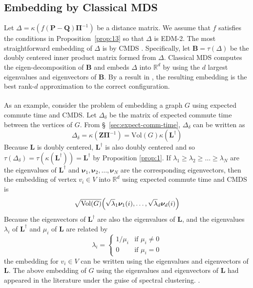 \documentclass[10pt,twocolumn]{article}
\numberwithin{equation}{section}
\begin{document}
\subsection{Embedding by Classical MDS}
\label{sec:embedd-class-mds}
Let $\Delta = \kappa(f(\mathbf{P} - \mathbf{Q})\bm{\Pi}^{-1})$ be a
distance matrix. We assume that $f$ satisfies the conditions in
Proposition~\ref{prop:13} so that $\Delta$ is EDM-2. The most
straightforward embedding of $\Delta$ is by CMDS
\cite{gower66:_some,torgesen52:_multid}. Specifically, let $\mathbf{B}
= \tau(\Delta)$ be the doubly centered inner product matrix
formed from $\Delta$. Classical MDS computes the eigen-decomposition of
$\mathbf{B}$ and embeds $\Delta$ into $\mathbb{R}^{d}$ by using
the $d$ largest eigenvalues and eigenvectors of $\mathbf{B}$. By a
result in \cite{eckart36:_approx}, the resulting embedding is the
best rank-$d$ approximation to the correct configuration. \\ \\
\noindent
As an example, consider the problem of embedding a graph $G$ using
expected commute time and CMDS. Let $\Delta_\delta$ be the
matrix of expected commute time between the vertices of $G$. From
\S~\ref{sec:expect-comm-time}, $\Delta_{\delta}$ can be written as
\begin{equation*}
  \Delta_{\delta} = \kappa(\mathbf{Z}\bm{\Pi}^{-1}) = \mathrm{Vol}(G)
  \kappa(\mathbf{L}^{\dagger})
\end{equation*}
Because $\mathbf{L}$ is doubly centered, $\mathbf{L}^{\dagger}$ is
also doubly centered and so $\tau(\Delta_{\delta}) =
\tau(\kappa(\mathbf{L}^{\dagger})) = \mathbf{L}^{\dagger}$ by
Proposition \ref{prop:1}. If $\lambda_1 \geq \lambda_2 \geq \dots \geq
\lambda_N$ are the eigenvalues of $\mathbf{L}^{\dagger}$ and
$\bm{\nu}_1, \bm{\nu}_2, \dots, \bm{\nu}_N$ are the corresponding
eigenvectors, then the embedding of vertex $v_i \in V$ into
$\mathbb{R}^{d}$ using expected commute time and CMDS is
\begin{equation}
  \label{eq:9}
  \sqrt{\mathrm{Vol}(G)} 
\Bigl(\sqrt{\lambda}_1 \bm{\nu}_1(i), \dots, \sqrt{\lambda}_d \bm{\nu}_d(i) \Bigr)
\end{equation}
Because the eigenvectors of $\mathbf{L}^{\dagger}$ are also the
eigenvalues of $\mathbf{L}$, and the eigenvalues $\lambda_i$ of  
$\mathbf{L}^{\dagger}$ and $\mu_i$ of $\mathbf{L}$ are related by
\begin{equation}
  \label{eq:19}
  \lambda_i = \begin{cases}
    1/\mu_i & \text{if $\mu_i \not = 0$} \\
    0 & \text{if $\mu_i = 0$}
    \end{cases}
\end{equation}
the embedding for $v_i \in V$ can be written using the eigenvalues and
eigenvectors of $\mathbf{L}$. The above embedding of $G$ using the
eigenvalues and eigenvectors of
$\mathbf{L}$ had appeared in the literature under the guise of
spectral clustering.
\cite{yen07:_graph,luxburg07:_tutor_spect_clust}.
\end{document}
